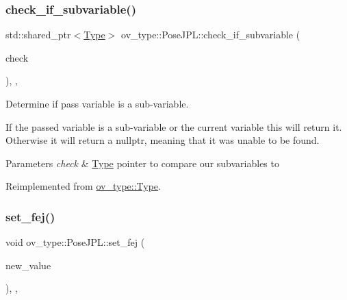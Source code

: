 \subsubsection{\texorpdfstring{check\+\_\+if\+\_\+subvariable()}{check\_if\_subvariable()}}
{\footnotesize\ttfamily std\+::shared\+\_\+ptr$<$\hyperlink{classov__type_1_1Type}{Type}$>$ ov\+\_\+type\+::\+Pose\+J\+P\+L\+::check\+\_\+if\+\_\+subvariable (\begin{DoxyParamCaption}\item[{const std\+::shared\+\_\+ptr$<$ \hyperlink{classov__type_1_1Type}{Type} $>$}]{check }\end{DoxyParamCaption})\hspace{0.3cm}{\ttfamily [inline]}, {\ttfamily [override]}, {\ttfamily [virtual]}}



Determine if pass variable is a sub-\/variable. 

If the passed variable is a sub-\/variable or the current variable this will return it. Otherwise it will return a nullptr, meaning that it was unable to be found.


\begin{DoxyParams}{Parameters}
{\em check} & \hyperlink{classov__type_1_1Type}{Type} pointer to compare our subvariables to \\
\hline
\end{DoxyParams}


Reimplemented from \hyperlink{classov__type_1_1Type_a95fcdbc584256baffc78935de5ab5da3}{ov\+\_\+type\+::\+Type}.

\mbox{\label{classov__type_1_1PoseJPL_aa20a30cf44fefdb749565c0e60fe027a}} 
\subsubsection{\texorpdfstring{set\+\_\+fej()}{set\_fej()}}
{\footnotesize\ttfamily void ov\+\_\+type\+::\+Pose\+J\+P\+L\+::set\+\_\+fej (\begin{DoxyParamCaption}\item[{const Eigen\+::\+Matrix\+Xd \&}]{new\+\_\+value }\end{DoxyParamCaption})\hspace{0.3cm}{\ttfamily [inline]}, {\ttfamily [override]}, {\ttfamily [virtual]}}



